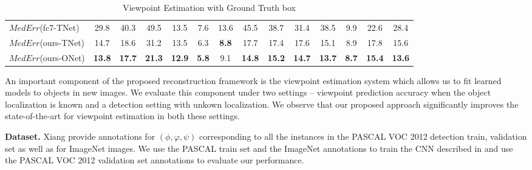 \begin{table*}
{\begin{tabular}{lcccccccccccc|c}
{\footnotesize{}$MedErr$(fc7-TNet)} & {\footnotesize{}29.8} & {\footnotesize{}40.3} & {\footnotesize{}49.5} & {\footnotesize{}13.5} & {\footnotesize{}7.6} & {\footnotesize{}13.6} & {\footnotesize{}45.5} & {\footnotesize{}38.7} & {\footnotesize{}31.4} & {\footnotesize{}38.5} & {\footnotesize{}9.9} & {\footnotesize{}22.6} & {\footnotesize{}28.4}\tabularnewline
{\footnotesize{}$MedErr$(ours-TNet)} & {\footnotesize{}14.7} & {\footnotesize{}18.6} & {\footnotesize{}31.2} & {\footnotesize{}13.5} & {\footnotesize{}6.3} & \textbf{\footnotesize{}8.8} & {\footnotesize{}17.7} & {\footnotesize{}17.4} & {\footnotesize{}17.6} & {\footnotesize{}15.1} & {\footnotesize{}8.9} & {\footnotesize{}17.8} & {\footnotesize{}15.6}\tabularnewline
{\footnotesize{}$MedErr$(ours-ONet)} & \textbf{\footnotesize{}13.8} & \textbf{\footnotesize{}17.7} & \textbf{\footnotesize{}21.3} & \textbf{\footnotesize{}12.9} & \textbf{\footnotesize{}5.8} & {\footnotesize{}9.1} & \textbf{\footnotesize{}14.8} & \textbf{\footnotesize{}15.2} & \textbf{\footnotesize{}14.7} & \textbf{\footnotesize{}13.7} & \textbf{\footnotesize{}8.7} & \textbf{\footnotesize{}15.4} & \textbf{\footnotesize{}13.6}\tabularnewline
\bottomrule
\end{tabular}}
\caption{Viewpoint Estimation with Ground Truth box}
\label{table:poseGtEval}
\end{table*}

An important component of the proposed reconstruction framework is the viewpoint estimation system  which allows us to fit learned models to objects in new images. We evaluate this component under two settings -- viewpoint prediction accuracy when the object localization is known and a detection setting with unkown localization. We observe that our proposed approach significantly improves the state-of-the-art for viewpoint estimation in both these settings.

\vspace{3mm}
\noindent \textbf{Dataset.}
Xiang \etal \cite{pascal3d} provide annotations for $(\phi,\varphi,\psi)$ corresponding to all the instances in the PASCAL VOC 2012 detection train, validation set as well as for ImageNet images. We use the PASCAL train set and the ImageNet annotations to train the CNN described in  and use the PASCAL VOC 2012 validation set annotations to evaluate our performance. 

